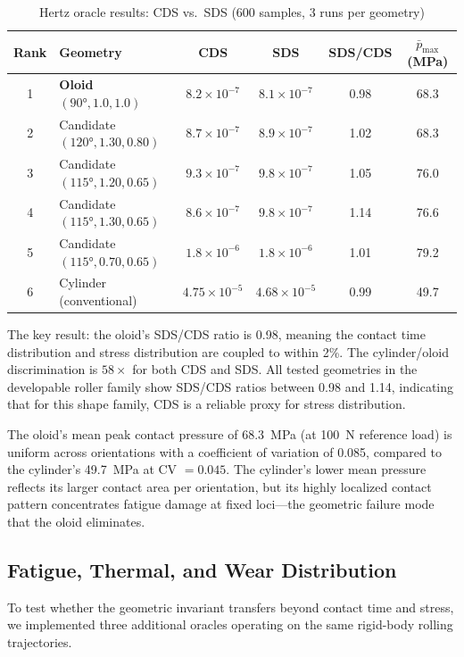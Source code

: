 \documentclass[11pt,a4paper]{article}
\begin{document}
\begin{table}[h]
\centering
\caption{Hertz oracle results: CDS vs.\ SDS (600 samples, 3 runs per geometry)}
\label{tab:hertz}
\begin{tabular}{clcccc}
\toprule
Rank & Geometry & CDS & SDS & SDS/CDS & $\bar{p}_{\max}$ (MPa) \\
\midrule
1 & \textbf{Oloid} $(90°, 1.0, 1.0)$
  & $8.2 \times 10^{-7}$ & $8.1 \times 10^{-7}$ & 0.98 & 68.3 \\
2 & Candidate $(120°, 1.30, 0.80)$
  & $8.7 \times 10^{-7}$ & $8.9 \times 10^{-7}$ & 1.02 & 68.3 \\
3 & Candidate $(115°, 1.20, 0.65)$
  & $9.3 \times 10^{-7}$ & $9.8 \times 10^{-7}$ & 1.05 & 76.0 \\
4 & Candidate $(115°, 1.30, 0.65)$
  & $8.6 \times 10^{-7}$ & $9.8 \times 10^{-7}$ & 1.14 & 76.6 \\
5 & Candidate $(115°, 0.70, 0.65)$
  & $1.8 \times 10^{-6}$ & $1.8 \times 10^{-6}$ & 1.01 & 79.2 \\
6 & Cylinder (conventional)
  & $4.75 \times 10^{-5}$ & $4.68 \times 10^{-5}$ & 0.99 & 49.7 \\
\bottomrule
\end{tabular}
\end{table}

The key result: the oloid's SDS/CDS ratio is 0.98, meaning the contact
time distribution and stress distribution are coupled to within 2\%.
The cylinder/oloid discrimination is $58\times$ for both CDS and SDS.
All tested geometries in the developable roller family show SDS/CDS
ratios between 0.98 and 1.14, indicating that for this shape family,
CDS is a reliable proxy for stress distribution.

The oloid's mean peak contact pressure of 68.3~MPa (at 100~N reference
load) is uniform across orientations with a coefficient of variation
of 0.085, compared to the cylinder's 49.7~MPa at CV $= 0.045$. The
cylinder's lower mean pressure reflects its larger contact area per
orientation, but its highly localized contact pattern concentrates
fatigue damage at fixed loci---the geometric failure mode that the
oloid eliminates.

\subsection{Fatigue, Thermal, and Wear Distribution}
\label{sec:ftw}

To test whether the geometric invariant transfers beyond contact time and stress, we implemented three additional oracles operating on the same rigid-body rolling trajectories.
\end{document}
